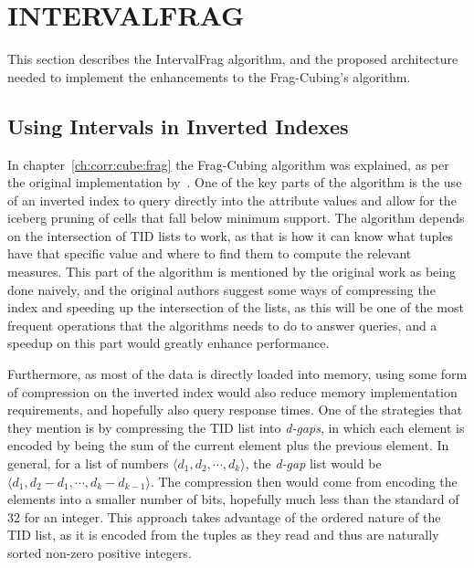 
\chapter{INTERVALFRAG}\label{ch:interval}

This section describes the IntervalFrag algorithm, and the proposed architecture needed to implement the enhancements to the Frag-Cubing's algorithm.

\section{Using Intervals in Inverted Indexes}\label{ch:interval:problem}

In chapter~\ref{ch:corr:cube:frag} the Frag-Cubing algorithm was explained, as per the original implementation by~.
One of the key parts of the algorithm is the use of an inverted index to query directly into the attribute values and allow for the iceberg pruning of cells that fall below minimum support.
The algorithm depends on the intersection of TID lists to work, as that is how it can know what tuples have that specific value and where to find them to compute the relevant measures.
This part of the algorithm is mentioned by the original work as being done naively, and the original authors suggest some ways of compressing the index and speeding up the intersection of the lists, as this will be one of the most frequent operations that the algorithms needs to do to answer queries, and a speedup on this part would greatly enhance performance.

Furthermore, as most of the data is directly loaded into memory, using some form of compression on the inverted index would also reduce memory implementation requirements, and hopefully also query response times.
One of the strategies that they mention is by compressing the TID list into \textit{d-gaps}, in which each element is encoded by being the sum of the current element plus the previous element.
In general, for a list of numbers $\langle d_1, d_2 , \cdots, d_k \rangle$, the \textit{d-gap} list would be $\langle d_1 , d_2 - d_1 , \cdots, d_k - d_{k - 1} \rangle$.
The compression then would come from encoding the elements into a smaller number of bits, hopefully much less than the standard of 32 for an integer.
This approach takes advantage of the ordered nature of the TID list, as it is encoded from the tuples as they read and thus are naturally sorted non-zero positive integers.

